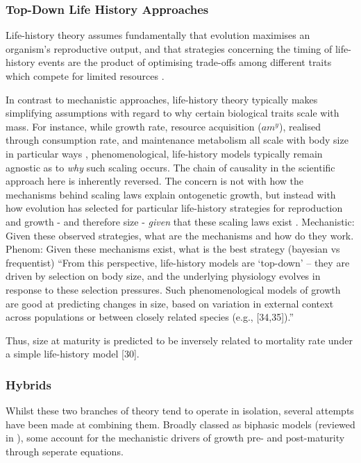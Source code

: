\documentclass[a4paper]{article} %
\begin{document}
        \subsubsection{Top-Down Life History Approaches}
        Life-history theory assumes fundamentally that evolution maximises an organism's reproductive output, and that strategies concerning the timing of life-history events are the product of optimising trade-offs among different traits which compete for limited resources \autocite{Day1997, Stearns1989, stearns1992evolution}.      

        In contrast to mechanistic approaches, life-history theory typically makes simplifying assumptions with regard to why certain biological traits scale with mass. \autocite{Day1997, Kozowski1987-indeterminate} For instance, while growth rate, resource acquisition ($am^y$), realised through consumption rate, and maintenance metabolism all scale with body size in particular ways \autocite{peters1983,Werner1988,brown2000-scaling-book}, phenomenological, life-history models typically remain agnostic as to \textit{why} such scaling occurs. The chain of causality in the scientific approach here is inherently reversed. The concern is not with how the mechanisms behind scaling laws explain ontogenetic growth, but instead with how evolution has selected for particular life-history strategies for reproduction and growth - and therefore size - \textit{given} that these scaling laws exist \autocite{Danko2017}. Mechanistic: Given these observed strategies, what are the mechanisms and how do they work. Phenom: Given these mechanisms exist, what is the best strategy (bayesian vs frequentist) ``From this perspective, life-history models are ‘top-down’ – they are driven by selection on body size, and the underlying physiology evolves in response to these selection pressures. Such phenomenological models of growth are good at predicting changes in size, based on variation in external context across populations or between closely related species (e.g., [34,35]).''
        
        Thus, size at maturity is predicted to be inversely related to mortality rate under a simple life-history model [30].

        \subsubsection{Hybrids}
        Whilst these two branches of theory tend to operate in isolation, several attempts have been made at combining them. Broadly classed as biphasic models (reviewed in \autocite{Wilson2018}), some account for the mechanistic drivers of growth pre- and post-maturity through seperate equations. 
        
\end{document}

